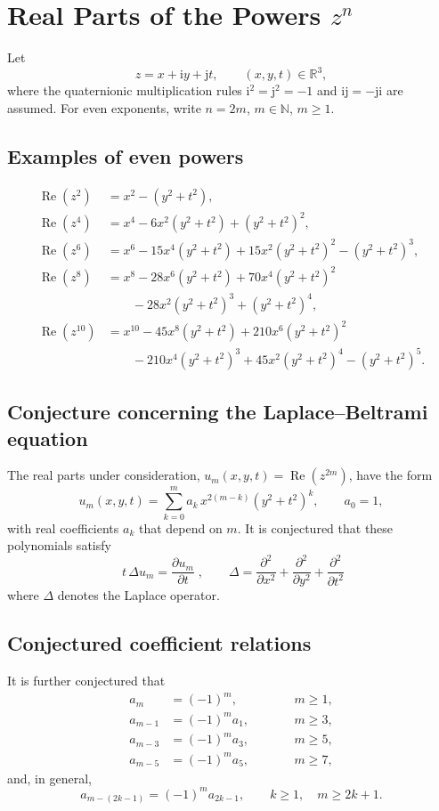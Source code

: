 \documentclass[11pt,a4paper]{article}
\newcommand{\ii}{\mathrm{i}}
\newcommand{\jj}{\mathrm{j}}
\DeclareMathOperator{\Real}{Re}
\newcommand{\R}{\mathbb{R}}
\newcommand{\N}{\mathbb{N}}
\begin{document}
\section*{Real Parts of the Powers \texorpdfstring{$z^n$}{z to the power n}}

Let
\[
  z=x+\ii y+\jj t,\qquad (x,y,t)\in\R^3,
\]
where the quaternionic multiplication rules
$\ii^2=\jj^2=-1$ and $\ii\jj=-\jj\ii$ are assumed.
For even exponents, write $n=2m$, $m\in\N$, $m\geq 1$.

\subsection*{Examples of even powers}
\begin{align*}
  \Real(z^2)
    &=x^2-(y^2+t^2),\\
  \Real(z^4)
    &=x^4-6x^2(y^2+t^2)+(y^2+t^2)^2,\\
  \Real(z^6)
    &=x^6-15x^4(y^2+t^2)+15x^2(y^2+t^2)^2-(y^2+t^2)^3,\\
  \Real(z^8)
    &=x^8-28x^6(y^2+t^2)+70x^4(y^2+t^2)^2\\
    &\qquad-28x^2(y^2+t^2)^3+(y^2+t^2)^4,\\
  \Real(z^{10})
    &=x^{10}-45x^8(y^2+t^2)+210x^6(y^2+t^2)^2\\
    &\qquad-210x^4(y^2+t^2)^3+45x^2(y^2+t^2)^4-(y^2+t^2)^5.
\end{align*}

\subsection*{Conjecture concerning the Laplace--Beltrami equation}
The real parts under consideration, $u_m(x,y,t)=\Real(z^{2m})$, have the form
\[
  u_m(x,y,t)
  =\sum_{k=0}^{m}a_k\,x^{2(m-k)}(y^2+t^2)^k,
  \qquad a_0=1,
\]
with real coefficients $a_k$ that depend on $m$.
It is conjectured that these polynomials satisfy
\[
  \boxed{\;t\,\Delta u_m=\frac{\partial u_m}{\partial t}\;},
  \qquad
  \Delta=
  \frac{\partial^2}{\partial x^2}
  +\frac{\partial^2}{\partial y^2}
  +\frac{\partial^2}{\partial t^2}
\]
where $\Delta$ denotes the Laplace operator.

\subsection*{Conjectured coefficient relations}
It is further conjectured that
\[
\begin{alignedat}{3}
  a_m     &=(-1)^m,     &\qquad& m\geq 1,\\
  a_{m-1} &=(-1)^m a_1, &      & m\geq 3,\\
  a_{m-3} &=(-1)^m a_3, &      & m\geq 5,\\
  a_{m-5} &=(-1)^m a_5, &      & m\geq 7,
\end{alignedat}
\]
and, in general,
\[
  \boxed{\;
  a_{m-(2k-1)}=(-1)^m a_{2k-1},
  \qquad k\geq 1,\quad m\geq 2k+1.
  \;}
\]
\end{document}
